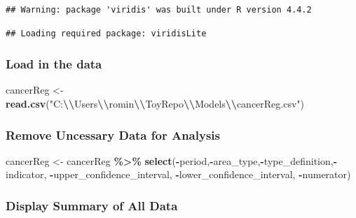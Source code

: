 \documentclass[
]{article}
\newenvironment{Shaded}{\begin{snugshade}}{\end{snugshade}}
\newcommand{\FunctionTok}[1]{\textcolor[rgb]{0.13,0.29,0.53}{\textbf{#1}}}
\newcommand{\NormalTok}[1]{#1}
\newcommand{\OtherTok}[1]{\textcolor[rgb]{0.56,0.35,0.01}{#1}}
\newcommand{\SpecialCharTok}[1]{\textcolor[rgb]{0.81,0.36,0.00}{\textbf{#1}}}
\newcommand{\StringTok}[1]{\textcolor[rgb]{0.31,0.60,0.02}{#1}}
\begin{document}
\begin{verbatim}
## Warning: package 'viridis' was built under R version 4.4.2
\end{verbatim}

\begin{verbatim}
## Loading required package: viridisLite
\end{verbatim}

\subsubsection{Load in the data}\label{load-in-the-data}

\begin{Shaded}
\begin{Highlighting}[]
\NormalTok{cancerReg }\OtherTok{\textless{}{-}} \FunctionTok{read.csv}\NormalTok{(}\StringTok{"C:}\SpecialCharTok{\textbackslash{}\textbackslash{}}\StringTok{Users}\SpecialCharTok{\textbackslash{}\textbackslash{}}\StringTok{romin}\SpecialCharTok{\textbackslash{}\textbackslash{}}\StringTok{ToyRepo}\SpecialCharTok{\textbackslash{}\textbackslash{}}\StringTok{Models}\SpecialCharTok{\textbackslash{}\textbackslash{}}\StringTok{cancerReg.csv"}\NormalTok{) }
\end{Highlighting}
\end{Shaded}

\subsubsection{Remove Uncessary Data for
Analysis}\label{remove-uncessary-data-for-analysis}

\begin{Shaded}
\begin{Highlighting}[]
\NormalTok{cancerReg }\OtherTok{\textless{}{-}}\NormalTok{ cancerReg }\SpecialCharTok{\%\textgreater{}\%} \FunctionTok{select}\NormalTok{(}\SpecialCharTok{{-}}\NormalTok{period,}\SpecialCharTok{{-}}\NormalTok{area\_type,}\SpecialCharTok{{-}}\NormalTok{type\_definition,}\SpecialCharTok{{-}}\NormalTok{indicator, }\SpecialCharTok{{-}}\NormalTok{upper\_confidence\_interval, }\SpecialCharTok{{-}}\NormalTok{lower\_confidence\_interval, }\SpecialCharTok{{-}}\NormalTok{numerator)}
\end{Highlighting}
\end{Shaded}

\subsubsection{Display Summary of All
Data}\label{display-summary-of-all-data}
\end{document}
